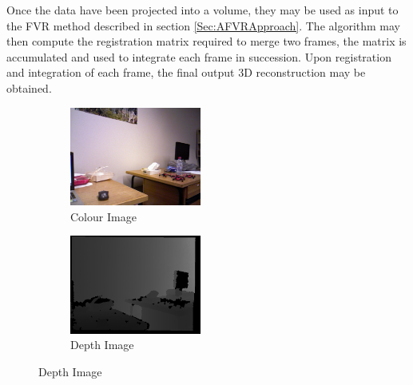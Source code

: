 Once the data have been projected into a volume, they may be used as input to the FVR method described in section \ref{Sec:AFVRApproach}. The algorithm may then compute the registration matrix required to merge two frames, the matrix is accumulated and used to integrate each frame in succession. Upon registration and integration of each frame, the final output 3D reconstruction may be obtained. \\

\begin{figure}[!htb] 
        \centering
        \begin{subfigure}[b]{1.8in}
                \includegraphics[width=1.7in]{images/ch2/colorF11}
                \caption{Colour Image}
                \label{fig:COLEXAMPLE}
        \end{subfigure}%
        \begin{subfigure}[b]{1.8in}
                \includegraphics[width=1.7in]{images/ch2/depthF11}
                \caption{Depth Image}
                \label{fig:DEPTHEXAMPLE}
        \end{subfigure}
        

\end{figure}
